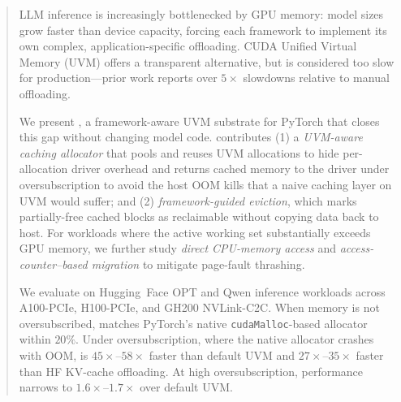 \begin{abstract}
LLM inference is increasingly bottlenecked by GPU memory:
    model sizes grow faster than device capacity,
    forcing each framework to implement its own complex, application-specific offloading.
CUDA Unified Virtual Memory (UVM) offers a transparent alternative,
    but is considered too slow for production---prior work reports
    over $5\times$ slowdowns relative to manual offloading.

We present {\uvmname}, a framework-aware UVM substrate for PyTorch
    that closes this gap without changing model code.
{\uvmname} contributes (1) a \emph{UVM-aware caching allocator}
    that pools and reuses UVM allocations to hide per-allocation driver overhead
    and returns cached memory to the driver under oversubscription
    to avoid the host OOM kills that a naive caching layer on UVM would suffer;
    and (2) \emph{framework-guided eviction},
    which marks partially-free cached blocks as reclaimable without copying data back to host.
For workloads where the active working set substantially exceeds GPU memory,
    we further study \emph{direct CPU-memory access} and
    \emph{access-counter--based migration} to mitigate page-fault thrashing.

We evaluate on Hugging~Face OPT and Qwen inference workloads
    across A100-PCIe, H100-PCIe, and GH200 NVLink-C2C.
When memory is not oversubscribed, {\uvmname} matches PyTorch's native
    \texttt{cudaMalloc}-based allocator within $20\%$.
Under oversubscription, where the native allocator crashes with OOM,
    {\uvmname} is $45\times$--$58\times$ faster than default UVM
    and $27\times$--$35\times$ faster than HF KV-cache offloading.
At high oversubscription, performance narrows to $1.6\times$--$1.7\times$ over default UVM.
\end{abstract}
